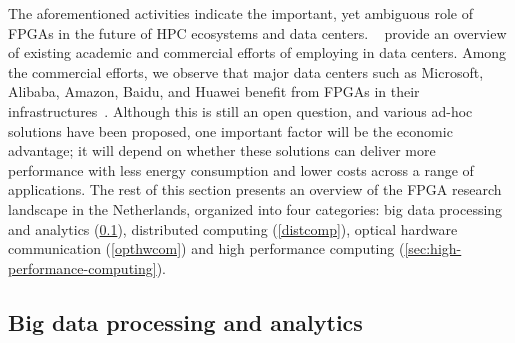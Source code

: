 The aforementioned %
activities indicate the important, yet %
ambiguous role of FPGAs in the future of HPC ecosystems and data centers. ~\citet {Bobda2022TheCloud} provide %
an overview %
of existing academic and commercial efforts of employing %
in data centers. Among the commercial efforts, we observe that major data centers such as Microsoft, Alibaba, Amazon, Baidu, and Huawei %
benefit from FPGAs in their infrastructures~\cite{firestone2018azure,PutnamAServices,caulfield2016cloud,ernst2020competing,xilinx_alibaba}. 
Although this is still an open question, and various %
ad-hoc solutions have been proposed, %
one important factor will be the economic advantage; %
it will depend on whether these solutions can deliver more performance with less energy consumption and lower costs across a range of applications.
The rest of this section presents an %
overview of the FPGA research landscape %
in the Netherlands, organized into four categories: big data processing and analytics (\ref{sec:big-data-processing-analytics}), distributed computing (\ref{distcomp}), optical hardware communication (\ref{opthwcom}) and high performance computing (\ref{sec:high-performance-computing}).






\subsection{Big data processing and analytics} \label{sec:big-data-processing-analytics}

